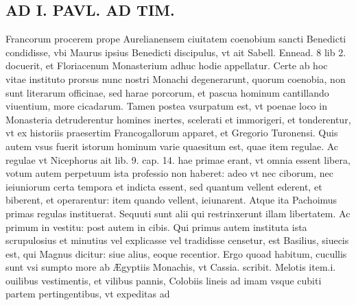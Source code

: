 \documentclass{article}
\begin{document}
\begin{pages}
\section*{AD I. PAVL. AD TIM. }
\marginpar{[ p.220 ]}\pstart Francorum procerem prope Aurelianensem ciuitatem coenobium sancti Benedicti condidisse, vbi Maurus ipsius Benedicti discipulus, vt ait Sabell. Ennead. 8 lib 2. docuerit, et Floriacenum Monasterium adhuc hodie appellatur. Certe ab hoc vitae instituto prorsus nunc nostri Monachi degenerarunt, quorum coenobia, non sunt literarum officinae, sed harae porcorum, et pascua hominum cantillando viuentium, more cicadarum. Tamen postea vsurpatum est, vt poenae loco in Monasteria detruderentur homines inertes, scelerati et immorigeri, et tonderentur, vt ex historiis praesertim Francogallorum apparet, et Gregorio Turonensi. Quis autem vsus fuerit istorum hominum varie quaesitum est, quae item regulae. Ac regulae vt Nicephorus ait lib. 9. cap. 14. hae primae erant, vt omnia essent libera, votum autem perpetuum ista professio non haberet: adeo vt nec ciborum, nec ieiuniorum certa tempora et indicta essent, sed quantum vellent ederent, et biberent, et operarentur: item quando vellent, ieiunarent. Atque ita Pachoimus primas regulas instituerat. Sequuti sunt alii qui restrinxerunt illam libertatem. Ac primum in vestitu: post autem in cibis. Qui primus autem instituta ista scrupulosius et minutius vel explicasse vel tradidisse censetur, est Basilius, siuecis est, qui Magnus dicitur: siue alius, eoque recentior. Ergo quoad habitum, cucullis sunt vsi sumpto more ab Ægyptiis Monachis, vt Cassia. scribit. Melotis item.i. ouilibus vestimentis, et vilibus pannis, Colobiis lineis ad imam vsque cubiti partem pertingentibus, vt expeditas ad  \pend

\end{pages}
\end{document}
